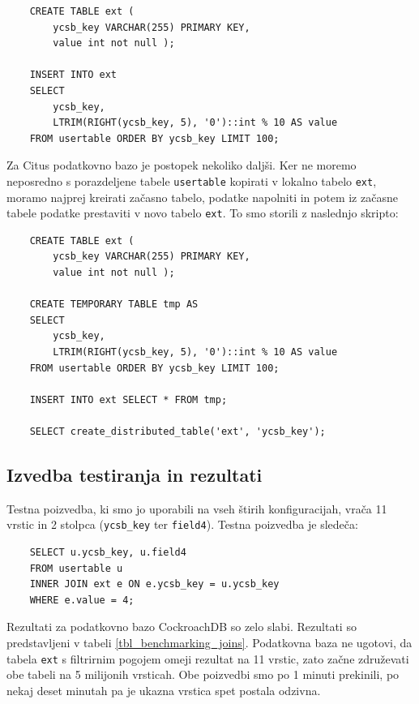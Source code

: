 \documentclass[a4paper, 12pt]{book}
\begin{document}
\begin{listing}[H]
\begin{verbatim}
    CREATE TABLE ext (
        ycsb_key VARCHAR(255) PRIMARY KEY,
        value int not null );

    INSERT INTO ext
    SELECT
        ycsb_key,
        LTRIM(RIGHT(ycsb_key, 5), '0')::int % 10 AS value
    FROM usertable ORDER BY ycsb_key LIMIT 100;
\end{verbatim}
\label{benchmarking_joins_data}
\end{listing}

Za Citus podatkovno bazo je postopek nekoliko daljši. Ker ne moremo neposredno s porazdeljene tabele \texttt{usertable} kopirati v lokalno tabelo \texttt{ext}, moramo najprej kreirati začasno tabelo, podatke napolniti in potem iz začasne tabele podatke prestaviti v novo tabelo \texttt{ext}. To smo storili z naslednjo skripto:

\begin{listing}[H]
\begin{verbatim}
    CREATE TABLE ext (
        ycsb_key VARCHAR(255) PRIMARY KEY,
        value int not null );

    CREATE TEMPORARY TABLE tmp AS
    SELECT
        ycsb_key,
        LTRIM(RIGHT(ycsb_key, 5), '0')::int % 10 AS value
    FROM usertable ORDER BY ycsb_key LIMIT 100;

    INSERT INTO ext SELECT * FROM tmp;

    SELECT create_distributed_table('ext', 'ycsb_key');
\end{verbatim}
\label{benchmarking_joins_citus_data}
\end{listing}

\subsection{Izvedba testiranja in rezultati}
Testna poizvedba, ki smo jo uporabili na vseh štirih konfiguracijah, vrača 11 vrstic in 2 stolpca (\texttt{ycsb\_key} ter \texttt{field4}). Testna poizvedba je sledeča:

\begin{listing}[H]
\begin{verbatim}
    SELECT u.ycsb_key, u.field4
    FROM usertable u
    INNER JOIN ext e ON e.ycsb_key = u.ycsb_key
    WHERE e.value = 4; 
\end{verbatim}
\label{benchmarking_joins_query}
\end{listing}

Rezultati za podatkovno bazo CockroachDB so zelo slabi. Rezultati so predstavljeni v tabeli \ref{tbl_benchmarking_joins}. Podatkovna baza ne ugotovi, da tabela \texttt{ext} s filtrirnim pogojem omeji rezultat na 11 vrstic, zato začne združevati obe tabeli na 5 milijonih vrsticah. Obe poizvedbi smo po 1 minuti prekinili, po nekaj deset minutah pa je ukazna vrstica spet postala odzivna.
\end{document}
